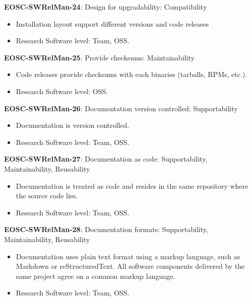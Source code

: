 \textbf{EOSC-SWRelMan-24}: Design for upgradability: Compatibility

\begin{itemize}
    \item Installation layout support different versions and code releases \cite{raymond_software_2013}
    \item Research Software level: Team, OSS.
\end{itemize}

\textbf{EOSC-SWRelMan-25}: Provide checksums: Maintainability

\begin{itemize}
    \item Code releases provide checksums with each binaries (tarballs, RPMs, etc.). \cite{raymond_software_2013}
    \item Research Software level: OSS.
\end{itemize}

\textbf{EOSC-SWRelMan-26}: Documentation version controlled: Supportability

\begin{itemize}
    \item Documentation is version controlled. \cite{orviz_fernandez_eosc-synergy_2020}
    \item Research Software level: Team, OSS.
\end{itemize}

\textbf{EOSC-SWRelMan-27}: Documentation as code: Supportability, Maintainability, Reusability

\begin{itemize}
    \item Documentation is treated as code and resides in the same repository where the source code lies. \cite{orviz_set_2017}
    \item Research Software level: Team, OSS.
\end{itemize}

\textbf{EOSC-SWRelMan-28}: Documentation formats: Supportability, Maintainability, Reusability

\begin{itemize}
    \item Documentation uses plain text format using a markup language, such as Markdown or reStructuredText. All software components delivered by the same project agree on a common markup language. \cite{orviz_set_2017,raymond_software_2013}
    \item Research Software level: Team, OSS.
\end{itemize}

